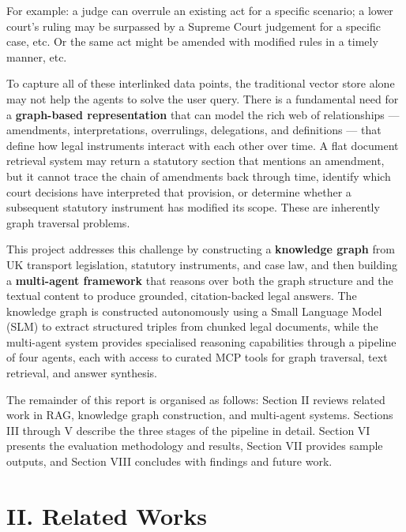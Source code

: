 \documentclass[10pt, a4paper, twocolumn]{article}
\begin{document}
For example: a judge can overrule an existing act for a specific scenario; a lower court's ruling may be surpassed by a Supreme Court judgement for a specific case, etc. Or the same act might be amended with modified rules in a timely manner, etc.

To capture all of these interlinked data points, the traditional vector store alone may not help the agents to solve the user query. There is a fundamental need for a \textbf{graph-based representation} that can model the rich web of relationships — amendments, interpretations, overrulings, delegations, and definitions — that define how legal instruments interact with each other over time. A flat document retrieval system may return a statutory section that mentions an amendment, but it cannot trace the chain of amendments back through time, identify which court decisions have interpreted that provision, or determine whether a subsequent statutory instrument has modified its scope. These are inherently graph traversal problems.

This project addresses this challenge by constructing a \textbf{knowledge graph} from UK transport legislation, statutory instruments, and case law, and then building a \textbf{multi-agent framework} that reasons over both the graph structure and the textual content to produce grounded, citation-backed legal answers. The knowledge graph is constructed autonomously using a Small Language Model (SLM) to extract structured triples from chunked legal documents, while the multi-agent system provides specialised reasoning capabilities through a pipeline of four agents, each with access to curated MCP tools for graph traversal, text retrieval, and answer synthesis.

The remainder of this report is organised as follows: Section II reviews related work in RAG, knowledge graph construction, and multi-agent systems. Sections III through V describe the three stages of the pipeline in detail. Section VI presents the evaluation methodology and results, Section VII provides sample outputs, and Section VIII concludes with findings and future work.

\section{II. Related Works}
\end{document}
